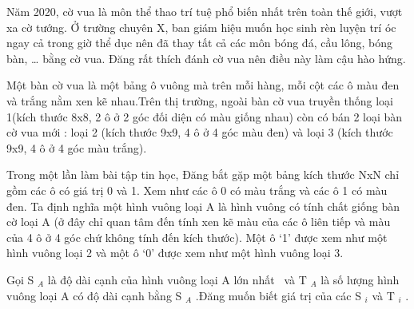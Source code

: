Năm 2020, cờ vua là môn thể thao trí tuệ phổ biến nhất trên toàn thế giới, vượt xa cờ tướng. Ở trường chuyên X, ban giám hiệu muốn học sinh rèn luyện trí óc ngay cả trong giờ thể dục nên đã thay tất cả các môn bóng đá, cầu lông, bóng bàn, … bằng cờ vua. Đăng rất thích đánh cờ vua nên điều này làm cậu hào hứng. \textbf{}

Một bàn cờ vua là một bảng ô vuông mà trên mỗi hàng, mỗi cột các ô màu đen và trắng nằm xen kẽ nhau.Trên thị trường, ngoài bàn cờ vua truyền thống loại 1(kích thước 8x8, 2 ô ở 2 góc đối diện có màu giống nhau) còn có bán 2 loại bàn cờ vua mới : loại 2 (kích thước 9x9, 4 ô ở 4 góc màu đen) và loại 3 (kích thước 9x9, 4 ô ở 4 góc màu trắng).

Trong một lần làm bài tập tin học, Đăng bắt gặp một bảng kích thước NxN chỉ gồm các ô có giá trị 0 và 1. Xem như các ô 0 có màu trắng và các ô 1 có màu đen. Ta định nghĩa một hình vuông loại A là hình vuông có tính chất giống bàn cờ loại A (ở đây chỉ quan tâm đến tính xen kẽ màu của các ô liên tiếp và màu của 4 ô ở 4 góc chứ không tính đến kích thước). Một ô ‘1’ được xem như một hình vuông loại 2 và một ô ‘0’ được xem như một hình vuông loại 3.

Gọi S $_ A $ là độ dài cạnh của hình vuông loại A lớn nhất  và T $_ A $ là số lượng hình vuông loại A có độ dài cạnh bằng S $_ A $ .Đăng muốn biết giá trị của các S $_ i $ và T $_ i $ .